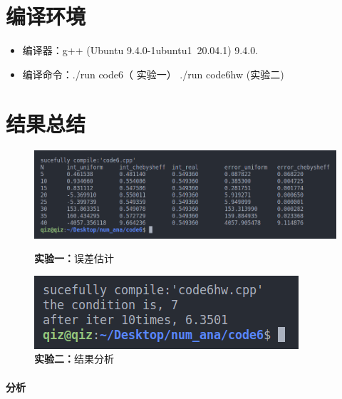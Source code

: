 \documentclass{article}
\begin{document}
\begin{CJK}{UTF8}{gbsn}
    	\section{编译环境}
    	\begin{itemize}
    		\item 编译器：g++ (Ubuntu 9.4.0-1ubuntu1~20.04.1) 9.4.0.
    		\item 编译命令：./run  code6（ 实验一） ./run  code6hw  (实验二)
    	\end{itemize}
    \section{结果总结}
    \begin{figure}[hbpt]
    	\centering
    	\includegraphics[width=0.6\linewidth]{code6.png}
    	\caption{\textbf{实验一：}误差估计}
    	\includegraphics[width=0.6\linewidth]{code6hw.png}
    	\caption{\textbf{实验二：}结果分析}
    \end{figure}
		
    \paragraph{分析}
\end{CJK}
\end{document}
